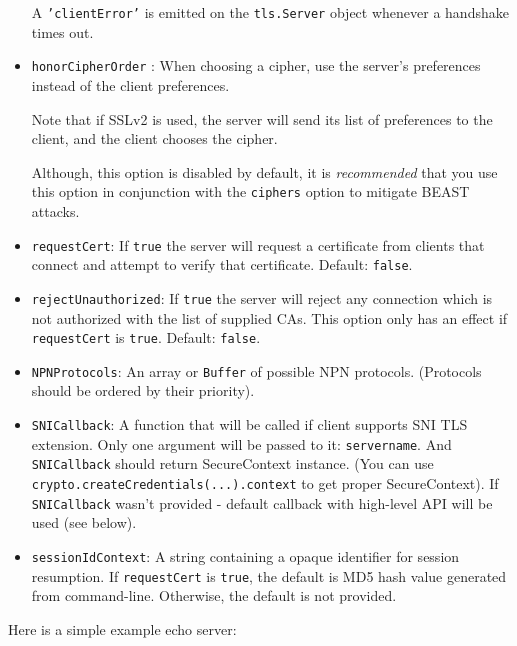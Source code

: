 \begin{itemize}
  A \texttt{'clientError'} is emitted on the \texttt{tls.Server} object
  whenever a handshake times out.
\item
  \texttt{honorCipherOrder} : When choosing a cipher, use the server's
  preferences instead of the client preferences.

  Note that if SSLv2 is used, the server will send its list of
  preferences to the client, and the client chooses the cipher.

  Although, this option is disabled by default, it is \emph{recommended}
  that you use this option in conjunction with the \texttt{ciphers}
  option to mitigate BEAST attacks.
\item
  \texttt{requestCert}: If \texttt{true} the server will request a
  certificate from clients that connect and attempt to verify that
  certificate. Default: \texttt{false}.
\item
  \texttt{rejectUnauthorized}: If \texttt{true} the server will reject
  any connection which is not authorized with the list of supplied CAs.
  This option only has an effect if \texttt{requestCert} is
  \texttt{true}. Default: \texttt{false}.
\item
  \texttt{NPNProtocols}: An array or \texttt{Buffer} of possible NPN
  protocols. (Protocols should be ordered by their priority).
\item
  \texttt{SNICallback}: A function that will be called if client
  supports SNI TLS extension. Only one argument will be passed to it:
  \texttt{servername}. And \texttt{SNICallback} should return
  SecureContext instance. (You can use
  \texttt{crypto.createCredentials(...).context} to get proper
  SecureContext). If \texttt{SNICallback} wasn't provided - default
  callback with high-level API will be used (see below).
\item
  \texttt{sessionIdContext}: A string containing a opaque identifier for
  session resumption. If \texttt{requestCert} is \texttt{true}, the
  default is MD5 hash value generated from command-line. Otherwise, the
  default is not provided.
\end{itemize}

Here is a simple example echo server:

